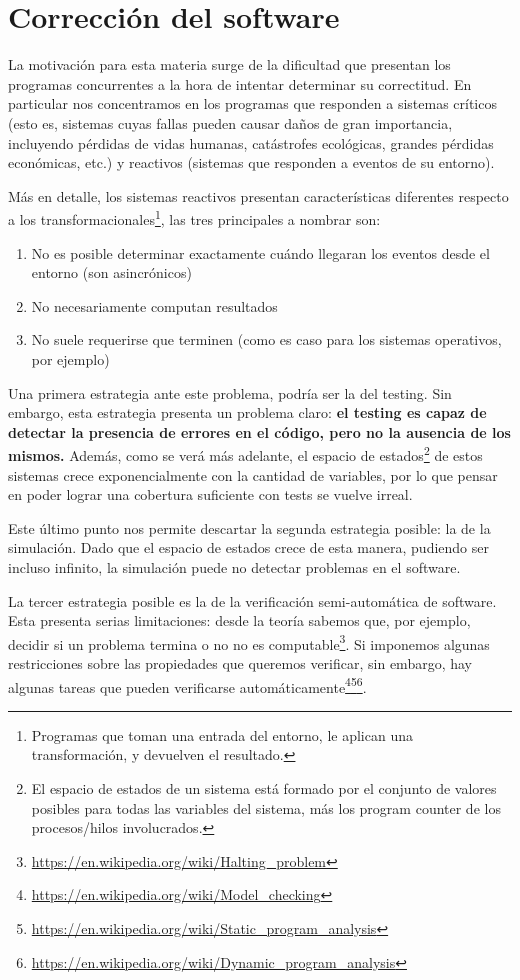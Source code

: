\section{Corrección del software}
La motivación para esta materia surge de la dificultad que presentan los programas concurrentes a la hora de intentar determinar su correctitud. En particular nos concentramos en los programas que responden a sistemas críticos (esto es, sistemas cuyas fallas pueden causar daños de gran importancia, incluyendo pérdidas de vidas humanas, catástrofes ecológicas, grandes pérdidas económicas, etc.) y reactivos (sistemas que responden a eventos de su entorno).

Más en detalle, los sistemas reactivos presentan características diferentes respecto a los transformacionales\footnote{Programas que toman una entrada del entorno, le aplican una transformación, y devuelven el resultado.}, las tres principales a nombrar son:
\begin{enumerate}
  \item No es posible determinar exactamente cuándo llegaran los eventos desde el entorno (son asincrónicos)
  \item No necesariamente computan resultados
  \item No suele requerirse que terminen (como es caso para los sistemas operativos, por ejemplo)
\end{enumerate}

Una primera estrategia ante este problema, podría ser la del testing. Sin embargo, esta estrategia presenta un problema claro: \textbf{el testing es capaz de detectar la presencia de errores en el código, pero no la ausencia de los mismos.} Además, como se verá más adelante, el espacio de estados\footnote{El espacio de estados de un sistema está formado por el conjunto de valores posibles para todas las variables del sistema, más los program counter de los procesos/hilos involucrados.} de estos sistemas crece exponencialmente con la cantidad de variables, por lo que pensar en poder lograr una cobertura suficiente con tests se vuelve irreal.

Este último punto nos permite descartar la segunda estrategia posible: la de la simulación. Dado que el espacio de estados crece de esta manera, pudiendo ser incluso infinito, la simulación puede no detectar problemas en el software.

La tercer estrategia posible es la de la verificación semi-automática de software. Esta presenta serias limitaciones: desde la teoría sabemos que, por ejemplo, decidir si un problema termina o no no es computable\footnote{\url{https://en.wikipedia.org/wiki/Halting_problem}}. Si imponemos algunas restricciones sobre las propiedades que queremos verificar, sin embargo, hay algunas tareas que pueden verificarse automáticamente\footnote{\url{https://en.wikipedia.org/wiki/Model_checking}}\footnote{\url{https://en.wikipedia.org/wiki/Static_program_analysis}}\footnote{\url{https://en.wikipedia.org/wiki/Dynamic_program_analysis}}.


